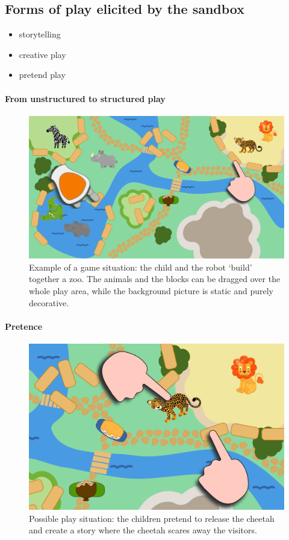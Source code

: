\documentclass[a4paper]{article}
\begin{document}
\subsection{Forms of play elicited by the sandbox}

\begin{itemize}
    \item storytelling
    \item creative play
    \item pretend play
\end{itemize}

\paragraph{From unstructured to structured play}

\begin{figure}
    \centering
    \includegraphics[width=0.9\linewidth]{sandbox}
    \caption{Example of a game situation: the child and the robot `build'
    together a zoo. The animals and the blocks can be dragged over the whole
    play area, while the background picture is static and purely decorative.}
    \label{fig|sandbox}
\end{figure}


\paragraph{Pretence}

\begin{figure}
    \centering
    \includegraphics[width=0.7\linewidth]{sandbox-release-cheetah}
    \caption{Possible play situation: the children pretend to release the cheetah
    and create a story where the cheetah scares away the visitors.}
    \label{}
\end{figure}
\end{document}
